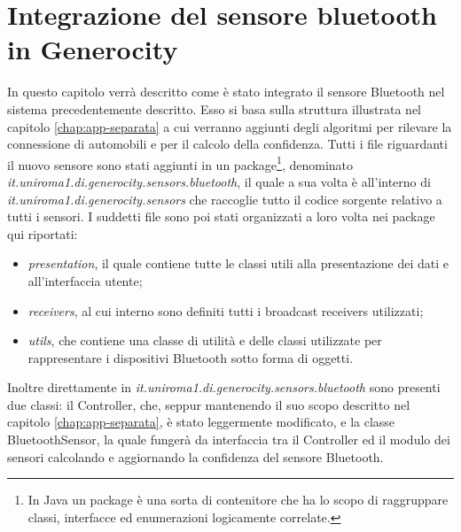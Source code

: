 \chapter{Integrazione del sensore bluetooth in Generocity} \label{chap:Bluetooth-sensor}
In questo capitolo verrà descritto come è stato integrato il sensore Bluetooth nel sistema precedentemente descritto. Esso si basa sulla struttura illustrata nel capitolo \ref{chap:app-separata} a cui verranno aggiunti degli algoritmi per rilevare la connessione di automobili e per il calcolo della confidenza. Tutti i file riguardanti il nuovo sensore sono stati aggiunti in un package\footnote{In Java un package è una sorta di contenitore che ha lo scopo di raggruppare classi, interfacce ed enumerazioni logicamente correlate.}, denominato \textit{it.uniroma1.di.generocity.sensors.bluetooth}, il quale a sua volta è all'interno di \textit{it.uniroma1.di.generocity.sensors} che raccoglie tutto il codice sorgente relativo a tutti i sensori. I suddetti file sono poi stati organizzati a loro volta nei package qui riportati:
\begin{itemize}
    \item \textit{presentation}, il quale contiene tutte le classi utili alla presentazione dei dati e all'interfaccia utente;
    \item \textit{receivers}, al cui interno sono definiti tutti i broadcast receivers utilizzati;
    \item \textit{utils}, che contiene una classe di utilità e delle classi utilizzate per rappresentare i dispositivi Bluetooth sotto forma di oggetti.
\end{itemize}
Inoltre direttamente in \textit{it.uniroma1.di.generocity.sensors.bluetooth} sono presenti due classi: il Controller, che, seppur mantenendo il suo scopo descritto nel capitolo \ref{chap:app-separata}, è stato leggermente modificato, e la classe BluetoothSensor, la quale fungerà da interfaccia tra il Controller ed il modulo dei sensori calcolando e aggiornando la confidenza del sensore Bluetooth.

